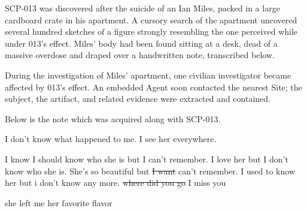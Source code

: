 SCP-013 was discovered after the suicide of an Ian Miles, packed in a large cardboard crate in his apartment. A cursory search of the apartment uncovered several hundred sketches of a figure strongly resembling the one perceived while under 013's effect. Miles' body had been found sitting at a desk, dead of a massive overdose and draped over a handwritten note, transcribed below.

During the investigation of Miles' apartment, one civilian investigator became affected by 013's effect. An embedded Agent soon contacted the nearest Site; the subject, the artifact, and related evidence were extracted and contained.

 Below is the note which was acquired along with SCP-013.

\begin{boxedminipage}{\textwidth}
\begin{flushleft}

I don't know what happened to me. I see her everywhere.\linebreak

I know I should know who she is but I can't remember. I love her but I don't know who she is. She's so beautiful but \sout{I want} can't remember. I used to know her but i don't know any more. \sout{where did you go} I miss you\linebreak

she left me her favorite flavor
\end{flushleft}
\end{boxedminipage}